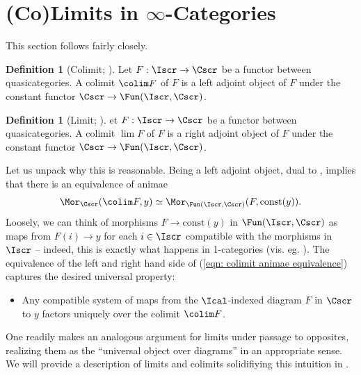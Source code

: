 \documentclass{amsart}
\theoremstyle{definition}
\newtheorem{definition}[theorem]{Definition}
\numberwithin{equation}{section}
\begin{document}
\section{(Co)Limits in $\infty$-Categories}\label{sec: colimits}
This section follows \cite[\S 6.1]{Wagner} fairly closely.
\begin{definition}[Colimit; {\cite[Def. 6.9]{Wagner}}]\label{def: colimit}
  Let $F:\Iscr\to\Cscr$ be a functor between quasicategories. A colimit $\colim F$ of $F$ is a left adjoint object of $F$ under the constant functor $\Cscr\to\Fun(\Iscr,\Cscr)$.
\end{definition}
\begin{definition}[Limit; {\cite[Def. 6.9]{Wagner}}]\label{def: limit}
  et $F:\Iscr\to\Cscr$ be a functor between quasicategories. A colimit $\lim F$ of $F$ is a right adjoint object of $F$ under the constant functor $\Cscr\to\Fun(\Iscr,\Cscr)$.
\end{definition}
Let us unpack why this is reasonable. Being a left adjoint object, dual to , implies that there is an equivalence of animae
\begin{equation}\label{eqn: colimit animae equivalence}
  \Mor_{\Cscr}(\colim F, y)\simeq\Mor_{\Fun(\Iscr,\Cscr)}(F,\mathrm{const}(y)).
\end{equation}
Loosely, we can think of morphisms $F\to\mathrm{const}(y)$ in $\Fun(\Iscr,\Cscr)$ as maps from $F(i)\to y$ for each $i\in\Iscr$ compatible with the morphisms in $\Iscr$ -- indeed, this is exactly what happens in 1-categories (vis. eg. \cite[\href{https://stacks.math.columbia.edu/tag/001I}{Tag 001I}]{stacks-project}). The equivalence of the left and right hand side of (\ref{eqn: colimit animae equivalence}) captures the desired universal property:
\begin{itemize}
  \item Any compatible system of maps from the $\Ical$-indexed diagram $F$ in $\Cscr$ to $y$ factors uniquely over the colimit $\colim F$.
\end{itemize}
One readily makes an analogous argument for limits under passage to opposites, realizing them as the ``universal object over diagrams'' in an appropriate sense. We will provide a description of limits and colimits solidifiying this intuition in .
\end{document}
